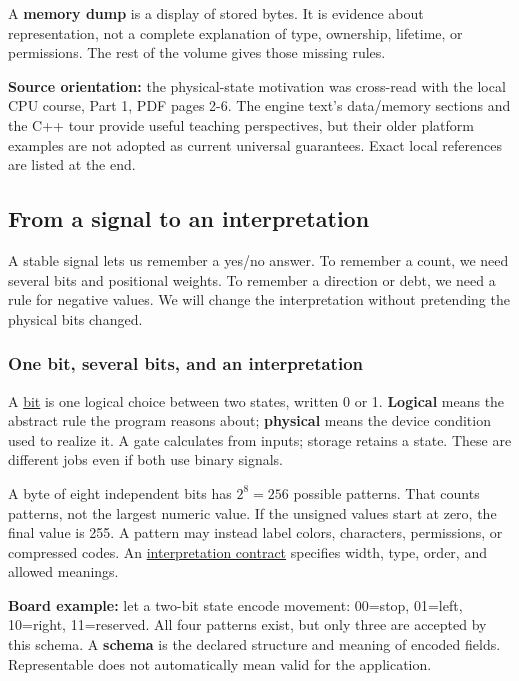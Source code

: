 A \textbf{memory dump} is a display of stored bytes. It is evidence about representation, not a complete explanation of type, ownership, lifetime, or permissions. The rest of the volume gives those missing rules.

\textbf{Source orientation:} the physical-state motivation was cross-read with the local CPU course, Part 1, PDF pages 2-6. The engine text's data/memory sections and the C++ tour provide useful teaching perspectives, but their older platform examples are not adopted as current universal guarantees. Exact local references are listed at the end.

\subsection{From a signal to an interpretation}\label{05-engine-i-ch001-from-a-signal-to-an-interpretation}

A stable signal lets us remember a yes/no answer. To remember a count, we need several bits and positional weights. To remember a direction or debt, we need a rule for negative values. We will change the interpretation without pretending the physical bits changed.

\subsubsection{One bit, several bits, and an interpretation}\label{05-engine-i-ch001-one-bit-several-bits-and-an-interpretation}

A \hyperref[appendix-ddbb69998a2e]{bit} is one logical choice between two states, written 0 or 1. \textbf{Logical} means the abstract rule the program reasons about; \textbf{physical} means the device condition used to realize it. A gate calculates from inputs; storage retains a state. These are different jobs even if both use binary signals.

A byte of eight independent bits has \(2^8=256\) possible patterns. That counts patterns, not the largest numeric value. If the unsigned values start at zero, the final value is 255. A pattern may instead label colors, characters, permissions, or compressed codes. An \hyperref[appendix-f414bd4ed05c]{interpretation contract} specifies width, type, order, and allowed meanings.

\textbf{Board example:} let a two-bit state encode movement: 00=stop, 01=left, 10=right, 11=reserved. All four patterns exist, but only three are accepted by this schema. A \textbf{schema} is the declared structure and meaning of encoded fields. Representable does not automatically mean valid for the application.

